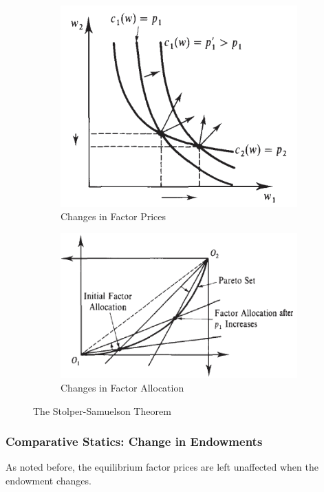 \documentclass{report}
\begin{document}
			\begin{figure}[h]
				\centering
				\begin{subfigure}{0.45\textwidth}
					\centering
					\includegraphics[width=.7\linewidth]{figures/Stolper_Samuelson}
					\caption{Changes in Factor Prices}
				\end{subfigure}
				\begin{subfigure}{0.45\textwidth}
					\centering
					\includegraphics[width=\linewidth]{figures/Stolper_Samuelson_2}
					\caption{Changes in Factor Allocation}
				\end{subfigure}
			\caption{The Stolper-Samuelson Theorem}
			\end{figure}
			
			\subsubsection{Comparative Statics: Change in Endowments}
			\begin{remark}
				As noted before, the equilibrium factor prices are left unaffected when the endowment changes.
			\end{remark}
			
\end{document}
